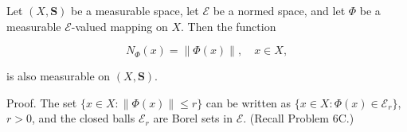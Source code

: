 Let $(X, \mathbf{S})$ be a measurable space, let $\mathcal{E}$ be a normed space, and let $\Phi$ be a measurable $\mathcal{E}$-valued mapping on $X$. Then the function

$$N_{\Phi}(x) = \| \Phi(x) \|, \quad x \in X,$$

is also measurable on $(X, \mathbf{S})$.

Proof. The set $\{x \in X : \| \Phi(x) \| \leq r\}$ can be written as $\{x \in X : \Phi(x) \in \mathcal{E}_r\}$, $r > 0$, and the closed balls $\mathcal{E}_r$ are Borel sets in $\mathcal{E}$. (Recall Problem 6C.)
